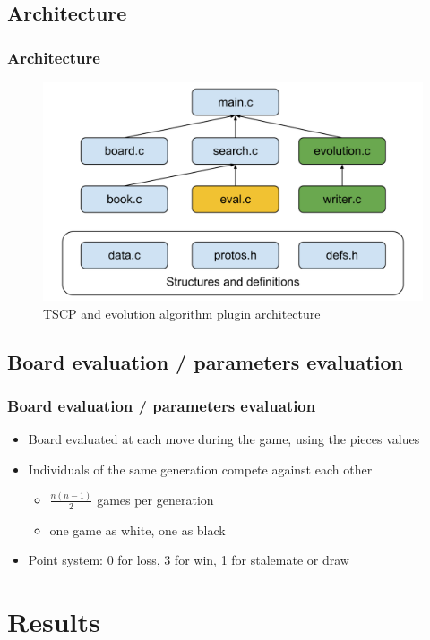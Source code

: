 \documentclass{beamer}
\begin{document}
\begin{frame}
\subsection{Architecture}
\frametitle{Architecture}
\begin{center}
\begin{figure}
\includegraphics[scale=0.3]{images/Chess_AI_Architecture.png}
\caption{TSCP and evolution algorithm plugin architecture}
\end{figure}
\end{center}
\end{frame}

\begin{frame}
\subsection{Board evaluation / parameters evaluation}
\frametitle{Board evaluation / parameters evaluation}
\begin{itemize}
\item Board evaluated at each move during the game, using the pieces values
\item Individuals of the same generation compete against each other
\begin{itemize}
\item $\frac{n(n-1)}{2}$ games per generation
\item one game as white, one as black
\end{itemize}
\item Point system: 0 for loss, 3 for win, 1 for stalemate or draw
\end{itemize}
\end{frame}

\section{Results}
\begin{frame}
\tableofcontents[currentsection]
\end{frame}
\end{document}
